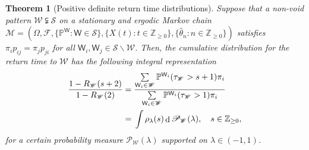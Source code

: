 \documentclass[10pt,journal,compsoc]{IEEEtran}
\newtheorem{theorem}{Theorem}
\DeclareMathOperator{\D}{d}
\begin{document}
\begin{theorem}[Positive definite return time distributions]\label{thm:cm_R}  Suppose that a non-void pattern $ \mathscr W\subsetneqq \mathscr S$ on a stationary and ergodic Markov chain  $ \mathscr M=(\varOmega,\mathscr F, \{\mathbb P^{\mathsf W}:\mathsf W\in\mathscr S\},\{X(t):t\in\mathbb Z_{\geq0}\}, \{\widehat{\theta}_n:n\in\mathbb  Z_{\geq0}\})$ satisfies   $ \pi_ip_{ij}=\pi_jp_{ji}$ for all $ \mathsf W_i,\mathsf W_j\in\mathscr S\smallsetminus\mathscr W$.   Then, the cumulative distribution for the return time to $ \mathscr W$ has the following  integral representation\begin{align}
\frac{1-R_{\mathscr W}(s+2)}{1-R_{\mathscr W}(2)}={}&\frac{\sum\limits_{\mathsf W_i\in\mathscr W}\mathbb P^{\mathsf W_i}(\tau_{  \mathscr W}> s+1) \pi_i}{\sum\limits_{\mathsf W_i\in\mathscr W}\mathbb P^{\mathsf W_i}(\tau_{  \mathscr W}> 1) \pi_i}\notag\\={}&\int \rho_\lambda(s)\D \mathscr P_{\mathscr W}(\lambda),\quad s\in\mathbb Z_{\geq0},\label{eq:R_A_pos_def}
\end{align}for a certain probability measure $ \mathscr P_{\mathscr W}(\lambda)$ supported on $ \lambda\in(-1,1)$.


\end{theorem}
\end{document}

